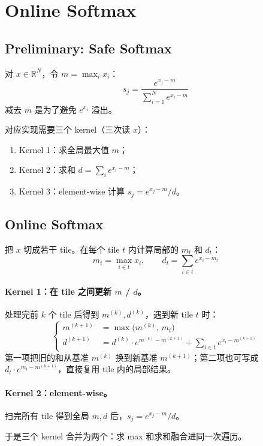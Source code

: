 \section{Online Softmax}

\subsection{Preliminary: Safe Softmax}

对 $x \in \mathbb{R}^N$，令 $m = \max_i x_i$：
\begin{equation}
  s_j = \frac{e^{x_j - m}}{\sum_{i=1}^{N} e^{x_i - m}}
\end{equation}
减去 $m$ 是为了避免 $e^{x_i}$ 溢出。

对应实现需要三个 kernel（三次读 $x$）：
\begin{enumerate}
  \item Kernel 1：求全局最大值 $m$；
  \item Kernel 2：求和 $d = \sum_i e^{x_i - m}$；
  \item Kernel 3：element-wise 计算 $s_j = e^{x_j - m} / d$。
\end{enumerate}

\subsection{Online Softmax}

把 $x$ 切成若干 tile。在每个 tile $t$ 内计算局部的 $m_t$ 和 $d_t$：
\begin{equation}
  m_t = \max_{i \in t} x_i, \qquad
  d_t = \sum_{i \in t} e^{x_i - m_t}
\end{equation}

\paragraph{Kernel 1：在 tile 之间更新 $m$ / $d$。}
处理完前 $k$ 个 tile 后得到 $m^{(k)}, d^{(k)}$，遇到新 tile $t$ 时：
\begin{equation}
  \left\{
  \begin{aligned}
    m^{(k+1)} &= \max\bigl(m^{(k)},\, m_t\bigr) \\
    d^{(k+1)} &= d^{(k)} \cdot e^{m^{(k)} - m^{(k+1)}} + \sum_{i \in t} e^{x_i - m^{(k+1)}}
  \end{aligned}
  \right.
\end{equation}
第一项把旧的和从基准 $m^{(k)}$ 换到新基准 $m^{(k+1)}$；第二项也可写成
$d_t \cdot e^{m_t - m^{(k+1)}}$，直接复用 tile 内的局部结果。

\paragraph{Kernel 2：element-wise。}
扫完所有 tile 得到全局 $m, d$ 后，$s_j = e^{x_j - m} / d$。

于是三个 kernel 合并为两个：求 max 和求和融合进同一次遍历。
